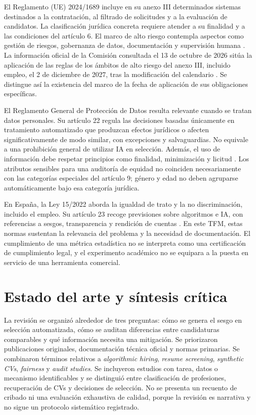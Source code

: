 \documentclass[11pt,a4paper,oneside]{report}
\begin{document}
El Reglamento (UE) 2024/1689 incluye en su anexo III determinados sistemas destinados a la contratación, al filtrado de solicitudes y a la evaluación de candidatos. La clasificación jurídica concreta requiere atender a su finalidad y a las condiciones del artículo 6. El marco de alto riesgo contempla aspectos como gestión de riesgos, gobernanza de datos, documentación y supervisión humana \cite{aiact2024}. La información oficial de la Comisión consultada el 13 de octubre de 2026 sitúa la aplicación de las reglas de los ámbitos de alto riesgo del anexo III, incluido empleo, el 2 de diciembre de 2027, tras la modificación del calendario \cite{comision2026,omnibus2026}. Se distingue así la existencia del marco de la fecha de aplicación de sus obligaciones específicas.

El Reglamento General de Protección de Datos resulta relevante cuando se tratan datos personales. Su artículo 22 regula las decisiones basadas únicamente en tratamiento automatizado que produzcan efectos jurídicos o afecten significativamente de modo similar, con excepciones y salvaguardias. No equivale a una prohibición general de utilizar IA en selección. Además, el uso de información debe respetar principios como finalidad, minimización y licitud \cite{rgpd2016}. Los atributos sensibles para una auditoría de equidad no coinciden necesariamente con las categorías especiales del artículo 9; género y edad no deben agruparse automáticamente bajo esa categoría jurídica.

En España, la Ley 15/2022 aborda la igualdad de trato y la no discriminación, incluido el empleo. Su artículo 23 recoge previsiones sobre algoritmos e IA, con referencias a sesgos, transparencia y rendición de cuentas \cite{ley152022}. En este TFM, estas normas sustentan la relevancia del problema y la necesidad de documentación. El cumplimiento de una métrica estadística no se interpreta como una certificación de cumplimiento legal, y el experimento académico no se equipara a la puesta en servicio de una herramienta comercial.

\section{Estado del arte y síntesis crítica}
La revisión se organizó alrededor de tres preguntas: cómo se genera el sesgo en selección automatizada, cómo se auditan diferencias entre candidaturas comparables y qué información necesita una mitigación. Se priorizaron publicaciones originales, documentación técnica oficial y normas primarias. Se combinaron términos relativos a \emph{algorithmic hiring}, \emph{resume screening}, \emph{synthetic CVs}, \emph{fairness} y \emph{audit studies}. Se incluyeron estudios con tarea, datos o mecanismo identificables y se distinguió entre clasificación de profesiones, recuperación de CVs y decisiones de selección. No se presenta un recuento de cribado ni una evaluación exhaustiva de calidad, porque la revisión es narrativa y no sigue un protocolo sistemático registrado.
\end{document}
